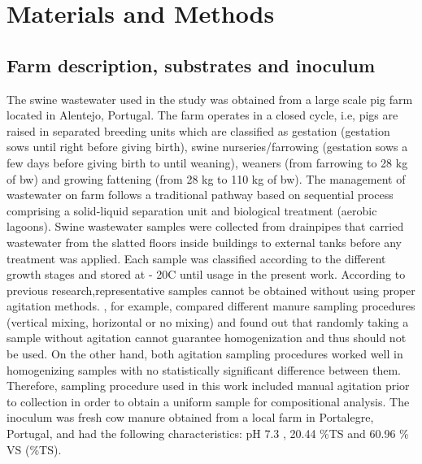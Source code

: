 \section{Materials and Methods}
\subsection{Farm description, substrates and inoculum}
The swine wastewater used in the study was obtained from a large scale pig farm located in Alentejo, Portugal. The farm operates in a closed cycle, i.e, pigs are raised in separated breeding units which are classified as gestation (gestation sows until right before giving birth), swine nurseries/farrowing (gestation sows a few days before giving birth to until weaning), weaners (from farrowing to 28 kg of bw) and growing fattening (from 28 kg to 110 kg of bw). The management of wastewater on farm follows a traditional pathway based on sequential process comprising a solid-liquid separation unit and biological treatment (aerobic lagoons). 
Swine wastewater samples were collected from drainpipes that carried wastewater from the slatted floors inside buildings to external tanks before any treatment was applied. Each sample was classified according to the different growth stages and stored at - 20\textdegree C until usage in the present work. According to previous research,representative samples cannot be obtained without using proper agitation methods. \cite{Zhu_2004}, for example, compared different manure sampling procedures (vertical mixing, horizontal or no mixing) and found out that randomly taking a sample without agitation cannot guarantee homogenization and thus should not be used. On the other hand, both agitation sampling procedures worked well in homogenizing samples with no statistically significant difference between them.  Therefore, sampling procedure used in this work included manual agitation prior to collection in order to obtain a uniform sample for compositional analysis. The inoculum was fresh cow manure obtained from a local farm in Portalegre, Portugal, and had the following characteristics: pH 7.3 , 20.44  \%TS and 60.96 \% VS (\%TS).

